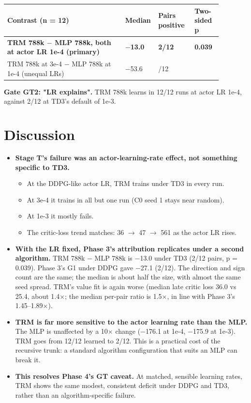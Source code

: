 \documentclass[11pt]{article}
\begin{document}
\begin{center}\small\begin{tabular}{>{\raggedright\arraybackslash}p{0.523\linewidth}>{\raggedleft\arraybackslash}p{0.069\linewidth}>{\raggedleft\arraybackslash}p{0.160\linewidth}>{\raggedleft\arraybackslash}p{0.126\linewidth}}
\toprule
Contrast (n = 12) & Median & Pairs positive & Two-sided p \\
\midrule
\textbf{TRM 788k $-$ MLP 788k, both at actor LR 1e-4 (primary)} & \textbf{$-$13.0} & \textbf{2/12} & \textbf{0.039} \\
TRM 788k at 3e-4 $-$ MLP 788k at 1e-4 (unequal LRs) & $-$53.6 & 0/12 & 0.0005 \\
\bottomrule
\end{tabular}\end{center}



\textbf{Gate GT2: "LR explains".} TRM 788k learns in 12/12 runs at actor LR 1e-4, against 2/12 at TD3's default of 1e-3.



\section*{Discussion}



\begin{itemize}
\item \textbf{Stage T's failure was an actor-learning-rate effect, not something specific to TD3.}
\begin{itemize}
\item At the DDPG-like actor LR, TRM trains under TD3 in every run.
\item At 3e-4 it trains in all but one run (C0 seed 1 stays near random).
\item At 1e-3 it mostly fails.
\item The critic-loss trend matches: 36 $\rightarrow$ 47 $\rightarrow$ 561 as the actor LR rises.
\end{itemize}
\item \textbf{With the LR fixed, Phase 3's attribution replicates under a second algorithm.} TRM 788k $-$ MLP 788k is $-$13.0 under TD3 (2/12 pairs, p = 0.039). Phase 3's G1 under DDPG gave $-$27.1 (2/12). The direction and sign count are the same; the median is about half the size, with almost the same seed spread. TRM's value fit is again worse (median late critic loss 36.0 vs 25.4, about 1.4$\times$; the median per-pair ratio is 1.5$\times$, in line with Phase 3's 1.45--1.89$\times$).
\item \textbf{TRM is far more sensitive to the actor learning rate than the MLP.} The MLP is unaffected by a 10$\times$ change ($-$176.1 at 1e-4, $-$175.9 at 1e-3). TRM goes from 12/12 learned to 2/12. This is a practical cost of the recursive trunk: a standard algorithm configuration that suits an MLP can break it.
\item \textbf{This resolves Phase 4's GT caveat.} At matched, sensible learning rates, TRM shows the same modest, consistent deficit under DDPG and TD3, rather than an algorithm-specific failure.
\end{itemize}
\end{document}
